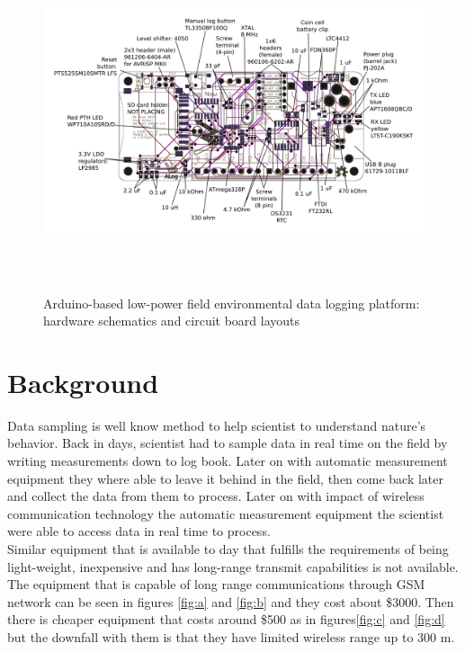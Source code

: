 \begin{figure}
\centering
\includegraphics[height=10cm]{graphics/ALog_drawing}
\caption{Arduino-based low-power field environmental data logging platform: hardware schematics and circuit board layouts\label{fig:BottleLog}\cite{ALog-BottleLogger}}
\end{figure}

\section{Background}
Data sampling is well know method to help scientist to understand nature's behavior. Back in days, scientist had to sample data in real time on the field by writing measurements down to log book. Later on with automatic measurement equipment they where able to leave it behind in the field, then come back later and collect the data from them to process. Later on with impact of wireless communication technology the automatic measurement equipment the scientist were able to access data in real time to process.\\
Similar equipment that is available to day that fulfills the requirements of being light-weight, inexpensive and has long-range transmit capabilities is not available. The equipment that is capable of long range communications through GSM network can be seen in figures \ref{fig:a} and \ref{fig:b} and they cost about \$3000. Then there is cheaper equipment that costs around \$500 as in figures\ref{fig:c} and  \ref{fig:d} but the downfall with them is that they have limited wireless range up to 300 m.

